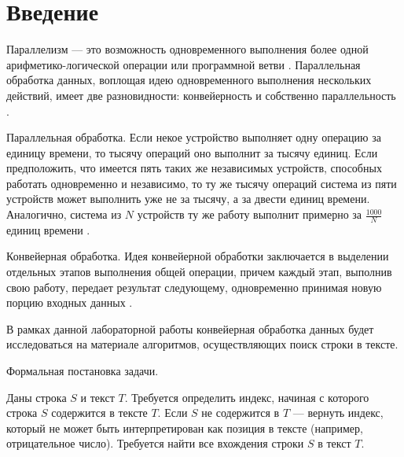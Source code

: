 {\center\chapter*{Введение}}

Параллелизм --- это возможность одновременного выполнения более одной арифметико-логической операции или программной ветви \cite{Shpakovskiy2013}. 
Параллельная обработка данных, воплощая идею одновременного выполнения нескольких действий, имеет две разновидности: конвейерность и собственно параллельность \cite{Antonov2002}.

Параллельная обработка. 
Если некое устройство выполняет одну операцию за единицу времени, то тысячу операций оно выполнит за тысячу единиц. 
Если предположить, что имеется пять таких же независимых устройств, способных работать одновременно и независимо, то ту же тысячу операций система из пяти устройств может выполнить уже не за тысячу, а за двести единиц времени. 
Аналогично, система из $N$ устройств ту же работу выполнит примерно за $\frac{1000}{N}$ единиц времени \cite{Antonov2002}.

Конвейерная обработка. 
Идея конвейерной обработки заключается в выделении отдельных этапов выполнения общей операции, причем каждый этап, выполнив свою работу, передает результат следующему, одновременно принимая новую порцию входных данных \cite{Antonov2002}.

В рамках данной лабораторной работы конвейерная обработка данных будет исследоваться на материале алгоритмов, осуществляющих поиск строки в тексте.

Формальная постановка задачи.

Даны строка $S$ и текст $T$. 
Требуется определить индекс, начиная с которого строка $S$ содержится в тексте $T$. 
Если $S$ не содержится в $T$ --- вернуть индекс, который не может быть интерпретирован как позиция в тексте (например, отрицательное число). 
Требуется найти все вхождения строки $S$ в текст $T$.
